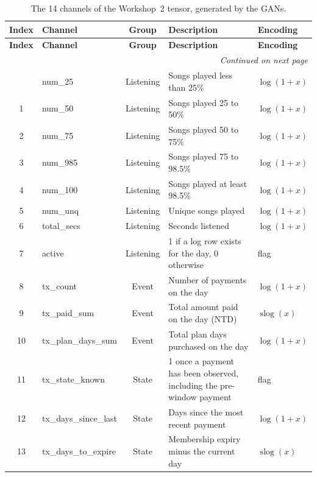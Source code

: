 \documentclass{article}
\newcommand{\slog}{\operatorname{slog}}
\begin{document}
\renewcommand{\arraystretch}{1.3}
\begin{longtable}{|c|l|c|p{6.4cm}|l|}
\hline
\textbf{Index} & \textbf{Channel} & \textbf{Group} & \textbf{Description} & \textbf{Encoding} \\ \hline
\endfirsthead
\hline
\textbf{Index} & \textbf{Channel} & \textbf{Group} & \textbf{Description} & \textbf{Encoding} \\ \hline
\endhead
\hline
\multicolumn{5}{r}{\small\textit{Continued on next page}} \\
\endfoot
\hline
\caption{The 14 channels of the Workshop~2 tensor, generated by the GANs.}
\label{tab:w5_channels}
\endlastfoot
0  & num\_25              & Listening & Songs played less than 25\% & $\log(1+x)$ \\ \hline
1  & num\_50              & Listening & Songs played 25 to 50\%     & $\log(1+x)$ \\ \hline
2  & num\_75              & Listening & Songs played 50 to 75\%     & $\log(1+x)$ \\ \hline
3  & num\_985             & Listening & Songs played 75 to 98.5\%   & $\log(1+x)$ \\ \hline
4  & num\_100             & Listening & Songs played at least 98.5\% & $\log(1+x)$ \\ \hline
5  & num\_unq             & Listening & Unique songs played         & $\log(1+x)$ \\ \hline
6  & total\_secs          & Listening & Seconds listened            & $\log(1+x)$ \\ \hline
7  & active               & Listening & 1 if a log row exists for the day, 0 otherwise & flag \\ \hline
8  & tx\_count            & Event & Number of payments on the day & $\log(1+x)$ \\ \hline
9  & tx\_paid\_sum        & Event & Total amount paid on the day (NTD) & $\slog(x)$ \\ \hline
10 & tx\_plan\_days\_sum  & Event & Total plan days purchased on the day & $\log(1+x)$ \\ \hline
11 & tx\_state\_known     & State & 1 once a payment has been observed, including the pre-window payment & flag \\ \hline
12 & tx\_days\_since\_last & State & Days since the most recent payment & $\log(1+x)$ \\ \hline
13 & tx\_days\_to\_expire & State & Membership expiry minus the current day & $\slog(x)$ \\ \hline
\end{longtable}
\end{document}

